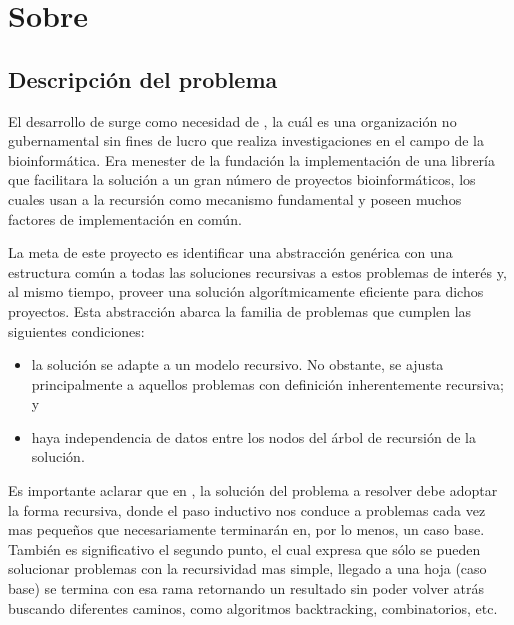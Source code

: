\chapter{Sobre \rc}

\section{Descripción del problema}
\label{problem_desc}

El desarrollo de \rc{} surge como necesidad de \fude, la cuál es una organización no gubernamental sin fines de lucro que
realiza investigaciones en el campo de la bioinformática. Era menester de la fundación la implementación de una librería que facilitara la
solución a un gran número de proyectos bioinformáticos, los cuales usan a la recursión como mecanismo fundamental y poseen muchos factores
de implementación en común.

La meta de este proyecto es identificar una abstracción genérica con una estructura común a todas las soluciones recursivas a estos
problemas de interés y, al mismo tiempo, proveer una solución algorítmicamente eficiente para dichos proyectos. Esta abstracción abarca la
familia de problemas que cumplen las siguientes condiciones:
\begin{itemize}
    \item   la solución se adapte a un modelo recursivo. No obstante, se ajusta principalmente a aquellos problemas con definición
            inherentemente recursiva; y
    \item   haya independencia de datos entre los nodos del árbol de recursión de la solución.
\end{itemize}

Es importante aclarar que en \rc, la solución del problema a resolver debe adoptar la forma recursiva, donde el paso inductivo nos conduce a
problemas cada vez mas pequeños que necesariamente terminarán en, por lo menos, un caso base. También es significativo el segundo punto, el
cual expresa que sólo se pueden solucionar problemas con la recursividad mas simple, llegado a una hoja (caso base) se termina con esa rama
retornando un resultado sin poder volver atrás buscando diferentes caminos, como algoritmos backtracking, combinatorios, etc.

